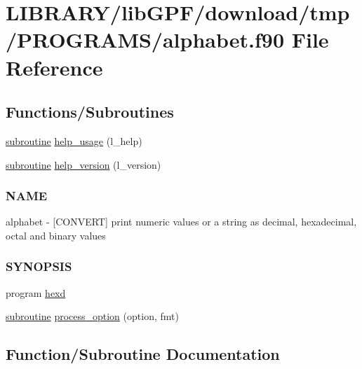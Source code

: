 \hypertarget{alphabet_8f90}{}\section{L\+I\+B\+R\+A\+R\+Y/lib\+G\+P\+F/download/tmp/\+P\+R\+O\+G\+R\+A\+M\+S/alphabet.f90 File Reference}
\label{alphabet_8f90}
\subsection*{Functions/\+Subroutines}
\begin{DoxyCompactItemize}
\item 
\hyperlink{M__stopwatch_83_8txt_acfbcff50169d691ff02d4a123ed70482}{subroutine} \hyperlink{alphabet_8f90_a3e09a3b52ee8fb04eeb93fe5761626a8}{help\+\_\+usage} (l\+\_\+help)
\item 
\hyperlink{M__stopwatch_83_8txt_acfbcff50169d691ff02d4a123ed70482}{subroutine} \hyperlink{alphabet_8f90_a39c21619b08a3c22f19e2306efd7f766}{help\+\_\+version} (l\+\_\+version)
\begin{DoxyCompactList}\small\item\em \subsubsection*{N\+A\+ME}

alphabet -\/ \mbox{[}C\+O\+N\+V\+E\+RT\mbox{]} print numeric values or a string as decimal, hexadecimal, octal and binary values \subsubsection*{S\+Y\+N\+O\+P\+S\+IS}\end{DoxyCompactList}\item 
program \hyperlink{alphabet_8f90_aa1b7d174dbbe1ca1d92bf00b80724012}{hexd}
\item 
\hyperlink{M__stopwatch_83_8txt_acfbcff50169d691ff02d4a123ed70482}{subroutine} \hyperlink{alphabet_8f90_a697200725bfc294a3efd62fcb58b7255}{process\+\_\+option} (option, fmt)
\end{DoxyCompactItemize}


\subsection{Function/\+Subroutine Documentation}
\mbox{\label{alphabet_8f90_a3e09a3b52ee8fb04eeb93fe5761626a8}} 
